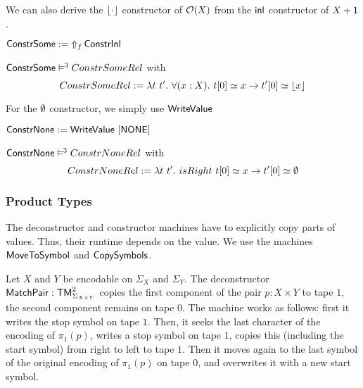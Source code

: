 We can also derive the $\Some{\cdot}$ constructor of $\Option(X)$ from the $\inl$ constructor of $X+\Unit$.
\begin{definition}[$\MS{ConstrSome}$]
  \label{def:Constr_Some}
  $\MS{ConstrSome} := \LiftAlphabet{\MS{ConstrInl}}{f}$
\end{definition}
\begin{lemma}
  \label{lem:Constr_Some_Sem}
  $\MS{ConstrSome} \RealiseIn{3} ConstrSomeRel$ with
  \[
    ConstrSomeRel := \lambda t~t'.~\forall(x:X).~t[0] \simeq x \rightarrow t'[0] \simeq \Some{x}
  \]
\end{lemma}
For the $\None$ constructor, we simply use $\MS{WriteValue}$
\begin{definition}[$\MS{ConstrNone}$]
  \label{def:Constr_None}
  $\MS{ConstrNone} := \MS{WriteValue}~[\MS{NONE}]$
\end{definition}
\begin{lemma}
  \label{lem:Constr_None_Sem}
  $\MS{ConstrNone} \RealiseIn{3} ConstrNoneRel$ with
  \[
    ConstrNoneRel := \lambda t~t'.~isRight~t[0] \simeq x \rightarrow t'[0] \simeq \None
  \]
\end{lemma}


\subsubsection{Product Types}
\label{sec:MatchPair}

The deconstructor and constructor machines have to explicitly copy parts of values.  Thus, their runtime depends on the value.  We use the machines
$\MS{MoveToSymbol}$ and $\MS{CopySymbols}$.

Let $X$ and $Y$ be encodable on $\Sigma_X$ and $\Sigma_Y$.  The deconstructor $\MS{MatchPair} : \TM_{\Sigma_{X \times Y}}^2$ copies the first
component of the pair $p:X \times Y$ to tape $1$, the second component remains on tape $0$.  The machine works as follows: first it writes the stop
symbol on tape $1$.  Then, it seeks the last character of the encoding of $\pi_1(p)$, writes a stop symbol on tape $1$, copies this (including the
start symbol) from right to left to tape $1$.  Then it moves again to the last symbol of the original encoding of $\pi_1(p)$ on tape $0$, and
overwrites it with a new start symbol.

